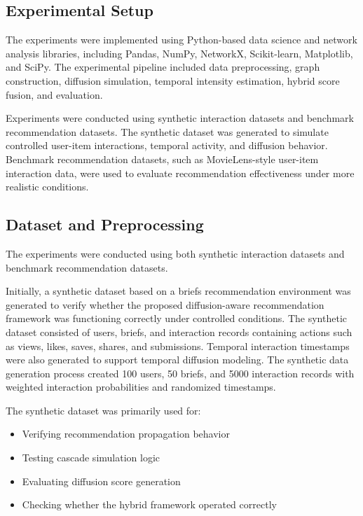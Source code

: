 \documentclass{article}
\begin{document}
\subsection{Experimental Setup}

The experiments were implemented using Python-based data science and network analysis libraries, including Pandas, NumPy, NetworkX, Scikit-learn, Matplotlib, and SciPy. The experimental pipeline included data preprocessing, graph construction, diffusion simulation, temporal intensity estimation, hybrid score fusion, and evaluation.

Experiments were conducted using synthetic interaction datasets and benchmark recommendation datasets. The synthetic dataset was generated to simulate controlled user-item interactions, temporal activity, and diffusion behavior. Benchmark recommendation datasets, such as MovieLens-style user-item interaction data, were used to evaluate recommendation effectiveness under more realistic conditions.

\subsection{Dataset and Preprocessing}

The experiments were conducted using both synthetic interaction datasets and benchmark recommendation datasets.

Initially, a synthetic dataset based on a briefs recommendation environment was generated to verify whether the proposed diffusion-aware recommendation framework was functioning correctly under controlled conditions. The synthetic dataset consisted of users, briefs, and interaction records containing actions such as views, likes, saves, shares, and submissions. Temporal interaction timestamps were also generated to support temporal diffusion modeling. The synthetic data generation process created 100 users, 50 briefs, and 5000 interaction records with weighted interaction probabilities and randomized timestamps. 

The synthetic dataset was primarily used for:
\begin{itemize}
\item Verifying recommendation propagation behavior
\item Testing cascade simulation logic
\item Evaluating diffusion score generation
\item Checking whether the hybrid framework operated correctly
\end{itemize}
\end{document}
